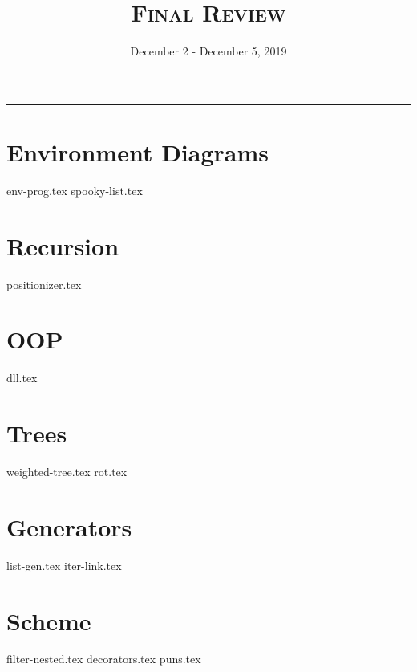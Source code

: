 \documentclass{exam}
\title{\textsc{Final Review}}
\date{December 2 - December 5, 2019}
\begin{document}
\maketitle\rule{\textwidth}{0.15em}
\fontsize{12}{15}\selectfont

\section{Environment Diagrams}
\begin{questions}
{env-prog.tex}
{spooky-list.tex}
\end{questions}

\section{Recursion}
\begin{questions}
{positionizer.tex}
\end{questions}

\section{OOP}
\begin{questions}
{dll.tex}
\end{questions}

\section{Trees}
\begin{questions}
{weighted-tree.tex}
{rot.tex}
\end{questions}

\section{Generators}
\begin{questions}
{list-gen.tex}
{iter-link.tex}
\end{questions}

\section{Scheme}
\begin{questions}
{filter-nested.tex}
{decorators.tex}
{puns.tex}
\end{questions}
\end{document}

